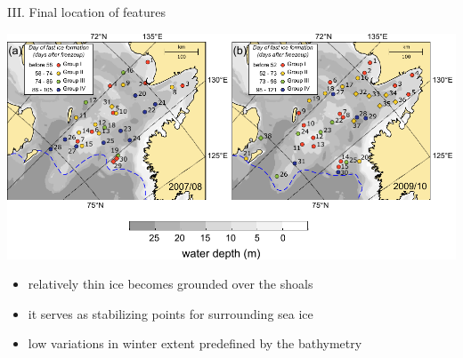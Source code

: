 \documentclass[8pt]{beamer}
\begin{document}
\setwatermark{\fontsize{125pt}{125pt}\selectfont{}}
\begin{frame}[fragile]{III. Final location of features}
	\begin{center}
		\includegraphics[width=1.0\textwidth]{./img/groups_map.pdf}
		\begin{itemize}
		\item relatively thin ice becomes grounded over the shoals \\
		\item it serves as stabilizing points for surrounding sea ice
		\item low variations in winter extent predefined by the bathymetry
		\end{itemize}
	\end{center}
\end{frame}
\end{document}
